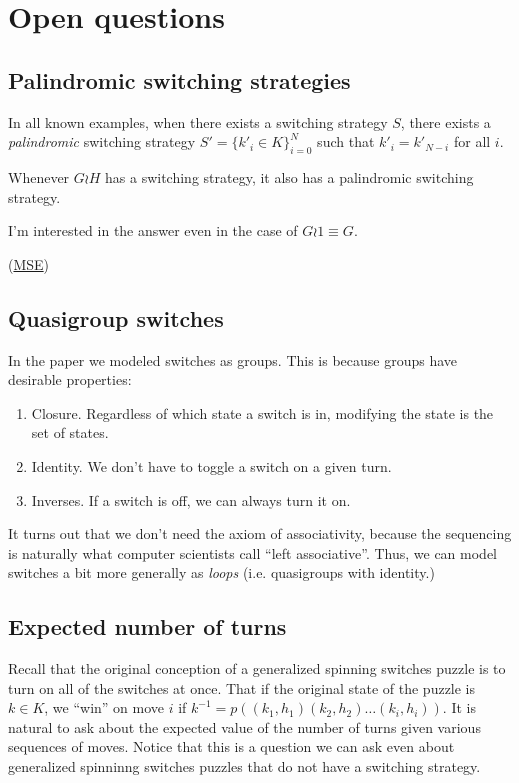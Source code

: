 \section{Open questions}
\label{sec:OpenQuestions}
\subsection{Palindromic switching strategies}
In all known examples, when there exists a switching strategy $S$,
there exists a \textit{palindromic} switching strategy
$S' = \{k'_i \in K\}_{i=0}^N$
such that $k'_i = k'_{N-i}$ for all $i$.
\begin{conjecture}
  Whenever $G \wr H$ has a switching strategy, it also has a palindromic switching
  strategy.
\end{conjecture}

I'm interested in the answer even in the case of $G \wr \mathrm{1} \equiv G$.

(\href{https://math.stackexchange.com/q/3706654/121988}{MSE})

\subsection{Quasigroup switches}
\label{sub:quasigroupSwitches}
In the paper we modeled switches as groups.
This is because groups have desirable properties: \begin{enumerate}
  \item Closure. Regardless of which state a switch is in, modifying the state is the set of states.
  \item Identity. We don't have to toggle a switch on a given turn.
  \item Inverses. If a switch is off, we can always turn it on.
\end{enumerate}

It turns out that we don't need the axiom of associativity,
because the sequencing is naturally what computer scientists call
``left associative''. Thus, we can model switches a bit more generally as
\textit{loops} (i.e. quasigroups with identity.)

\subsection{Expected number of turns}
Recall that the original conception of a generalized spinning switches puzzle
is to turn on all of the switches at once. That if the original state of
the puzzle is $k \in K$,
we ``win'' on move $i$ if $k^{-1} = p((k_1, h_1)(k_2, h_2)\dots(k_i, h_i))$.
It is natural to ask about the expected value of the number of turns given
various sequences of moves. Notice that this is a question we can ask
even about generalized spinninng switches puzzles that do not have a switching
strategy.

